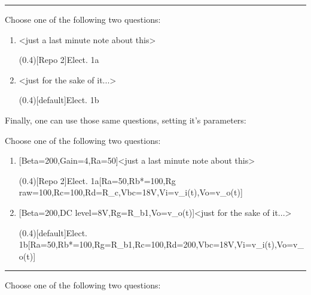 \documentclass[10pt]{article}
\begin{document}


\hrule\relax

Choose one of the following two questions:

\begin{enumerate}
  \item {}<just a last minute note about this>\par
  \ftikzQuestion(0.4)[Repo 2]{Elect. 1a}
  
  \item {}<just for the sake of it...>\par
  \ftikzQuestion(0.4)[default]{Elect. 1b}
\end{enumerate}

Finally, one can use those same questions, setting it's parameters:

\begin{codestore}[QuestionUse]
Choose one of the following two questions:

\begin{enumerate}
  \item {}[Beta=200,Gain=4,Ra=50\Omega]<just a last minute note about this>\par
  \ftikzQuestion(0.4)[Repo 2]{Elect. 1a}[Ra=50\Omega,Rb*=100\Omega,Rg raw=100,Rc=100,Rd=R_c,Vbc=18V,Vi=v_i(t),Vo=v_o(t)]
  
  \item {}[Beta=200,DC level=8V,Rg=R_{b1},Vo=v_o(t)]<just for the sake of it...>\par
  \ftikzQuestion(0.4)[default]{Elect. 1b}[Ra=50\Omega,Rb*=100\Omega,Rg=R_{b1},Rc=100,Rd=200\Omega,Vbc=18V,Vi=v_i(t),Vo=v_o(t)]
\end{enumerate}
\end{codestore}


\hrule\relax

Choose one of the following two questions:
\end{document}
